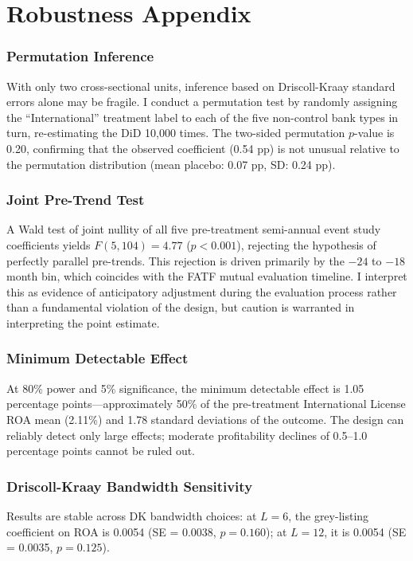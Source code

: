\documentclass[12pt]{article}
\begin{document}
\section{Robustness Appendix}
\label{sec:robustness_appendix}

\subsubsection*{Permutation Inference}
With only two cross-sectional units, inference based on Driscoll-Kraay standard errors alone may be fragile. I conduct a permutation test by randomly assigning the ``International'' treatment label to each of the five non-control bank types in turn, re-estimating the DiD 10,000 times. The two-sided permutation $p$-value is 0.20, confirming that the observed coefficient (0.54 pp) is not unusual relative to the permutation distribution (mean placebo: 0.07 pp, SD: 0.24 pp).

\subsubsection*{Joint Pre-Trend Test}
A Wald test of joint nullity of all five pre-treatment semi-annual event study coefficients yields $F(5, 104) = 4.77$ ($p < 0.001$), rejecting the hypothesis of perfectly parallel pre-trends. This rejection is driven primarily by the $-24$ to $-18$ month bin, which coincides with the FATF mutual evaluation timeline. I interpret this as evidence of anticipatory adjustment during the evaluation process rather than a fundamental violation of the design, but caution is warranted in interpreting the point estimate.

\subsubsection*{Minimum Detectable Effect}
At 80\% power and 5\% significance, the minimum detectable effect is 1.05 percentage points---approximately 50\% of the pre-treatment International License ROA mean (2.11\%) and 1.78 standard deviations of the outcome. The design can reliably detect only large effects; moderate profitability declines of 0.5--1.0 percentage points cannot be ruled out.

\subsubsection*{Driscoll-Kraay Bandwidth Sensitivity}
Results are stable across DK bandwidth choices: at $L = 6$, the grey-listing coefficient on ROA is 0.0054 (SE = 0.0038, $p = 0.160$); at $L = 12$, it is 0.0054 (SE = 0.0035, $p = 0.125$).
\end{document}
